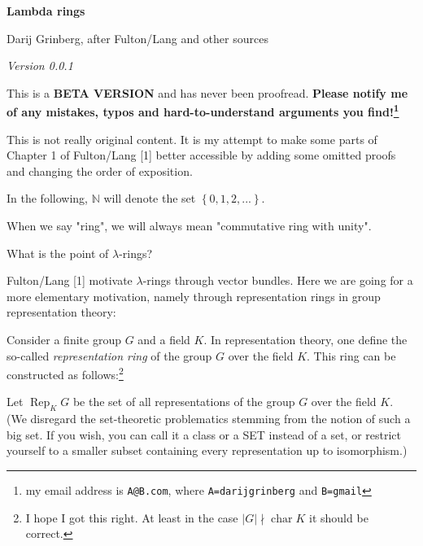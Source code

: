 \documentclass[12pt,final,notitlepage,onecolumn,german]{article}%
\begin{document}
\begin{center}
\textbf{Lambda rings}

Darij Grinberg, after Fulton/Lang and other sources

\textit{Version 0.0.1}
\end{center}

This is a \textbf{BETA VERSION} and has never been proofread. \textbf{Please
notify me of any mistakes, typos and hard-to-understand arguments you
find!\footnote{my email address is \texttt{A@B.com}, where
\texttt{A=darijgrinberg} and \texttt{B=gmail}}}

\bigskip


This is not really original content. It is my attempt to make some parts of
Chapter 1 of Fulton/Lang [1] better accessible by adding some omitted proofs
and changing the order of exposition.

\begin{center}
\end{center}

In the following, $\mathbb{N}$ will denote the set $\left\{
0,1,2,...\right\}  $.

When we say "ring", we will always mean "commutative ring with unity".

\begin{center}
\end{center}

What is the point of $\lambda$-rings?

Fulton/Lang [1] motivate $\lambda$-rings through vector bundles. Here we are
going for a more elementary motivation, namely through representation rings in
group representation theory:

Consider a finite group $G$ and a field $K$. In representation theory, one
define the so-called \textit{representation ring} of the group $G$ over the
field $K$. This ring can be constructed as follows:\footnote{I hope I got this
right. At least in the case $\left\vert G\right\vert \nmid\operatorname*{char}%
K$ it should be correct.}

Let $\operatorname*{Rep}_{K}G$ be the set of all representations of the group
$G$ over the field $K$. (We disregard the set-theoretic problematics stemming
from the notion of such a big set. If you wish, you can call it a class or a
SET instead of a set, or restrict yourself to a smaller subset containing
every representation up to isomorphism.)
\end{document}
